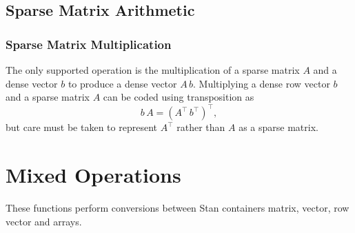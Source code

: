\begin{description}
{\begin{description}
\section{Sparse Matrix Arithmetic}


\subsection{Sparse Matrix Multiplication}


The only supported operation is the multiplication of a sparse matrix $A$ and a dense vector $b$ to produce a dense vector $A\,b$. Multiplying a dense row vector $b$ and a sparse matrix $A$ can be coded using transposition as \[ b \, A = (A^{\top} \, b^{\top})^{\top}, \] but care must be taken to represent $A^{\top}$ rather than $A$ as a sparse matrix.


\begin{description}    \end{description}


\chapter{Mixed Operations}\label{mixed-operations.chapter}


These functions perform conversions between Stan containers matrix, vector, row vector and arrays.



\end{description}}
\end{description}
